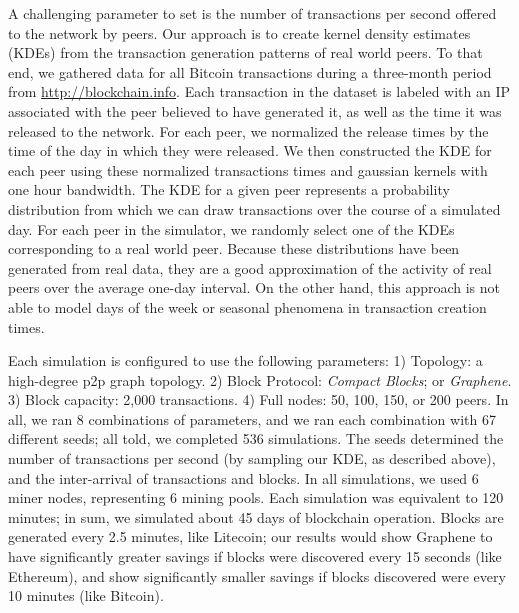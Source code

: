 A challenging parameter to set is the number of transactions per
second offered to the network by peers. Our approach is to create
kernel density estimates (KDEs) from the transaction generation
patterns of real world peers. To that end, we gathered data for all
Bitcoin transactions during a three-month period
from
{\url{http://blockchain.info}}. Each transaction in the dataset is
labeled with an IP associated with the peer believed to have generated
it, as well as the time it was released to the network.  For each peer,
we normalized the release times by the time of the day in which they
were released. We then constructed the KDE for each peer using these
normalized transactions times and gaussian kernels with one hour
bandwidth. The KDE for a given peer represents a probability
distribution from which we can draw transactions over the course of a
simulated day. For each peer in the simulator, we randomly select one
of the KDEs corresponding to a real world peer. Because these
distributions have been generated from real data, they are a good
approximation of the activity of real peers over the average one-day
interval. On the other hand, this approach is not able to model days
of the week or seasonal phenomena in transaction creation times.

Each simulation is configured to use the following parameters: 1)
Topology: a high-degree p2p graph topology.
2) Block Protocol: {\em
  Compact Blocks}; or {\em Graphene}.  3) Block capacity: 2,000
transactions.  4) Full nodes: 50, 100, 150, or 200 peers.  In all,
 we ran 8 combinations of parameters, and we
ran each combination with 67  different seeds;
all told, we completed 536
simulations. The seeds determined the number of transactions per
second (by sampling our KDE, as described above), and the inter-arrival
of transactions and blocks. 
In all simulations, we used 6 miner
nodes, representing 6 mining pools. Each simulation was equivalent to
120 minutes; in sum, we simulated about 45 days of %
blockchain operation. Blocks are generated every 2.5 minutes, like Litecoin; our results would show Graphene to have significantly greater savings if blocks were discovered every 15 seconds (like Ethereum), and show significantly smaller savings if blocks discovered were every 10 minutes (like Bitcoin). 

